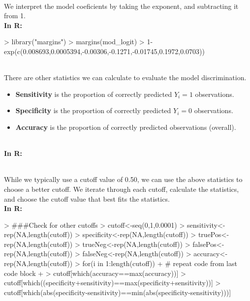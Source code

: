 \documentclass{article}
\begin{document}
\\ We interpret the model coeficients by taking the exponent, and subtracting it from 1.
\\ \textbf{In R:}
\begin{Schunk}
\begin{Sinput}
> library("margins")
> margins(mod_logit)
> 1- exp(c(0.008693,0.0005394,-0.00306,-0.1271,-0.01745,0.1972,0.0703))
\end{Sinput}
\end{Schunk}
\\ There are other statistics we can calculate to evaluate the model discrimination.
\begin{itemize}
\item  \textbf{Sensitivity} is the proportion of correctly predicted $Y_i=1$ observations. 
\item \textbf{Specificity} is the proportion of correctly predicted $Y_i=0$ observations.
\item \textbf{Accuracy} is the proportion of correctly predicted observations (overall).
\end{itemize}
\\ \textbf{In R:}
\begin{Schunk}
\end{Schunk}
\\ While we typically use a cutoff value of 0.50, we can use the above statistics to choose a better cutoff. We iterate through each cutoff, calculate the statistics, and choose the cutoff value that best fits the statistics.
\\ \textbf{In R:}
\begin{Schunk}
\begin{Sinput}
> ###Check for other cutoffs
> cutoff<-seq(0,1,0.0001)
> sensitivity<-rep(NA,length(cutoff))
> specificity<-rep(NA,length(cutoff))
> truePos<-rep(NA,length(cutoff))
> trueNeg<-rep(NA,length(cutoff))
> falsePos<-rep(NA,length(cutoff))
> falseNeg<-rep(NA,length(cutoff))
> accuracy<-rep(NA,length(cutoff))
> for(i in 1:length(cutoff)){
+ # repeat code from last code block
+ }
> cutoff[which(accuracy==max(accuracy))]
> cutoff[which((specificity+sensitivity)==max(specificity+sensitivity))]
> cutoff[which(abs(specificity-sensitivity)==min(abs(specificity-sensitivity)))]
\end{Sinput}
\end{Schunk}
\end{document}

